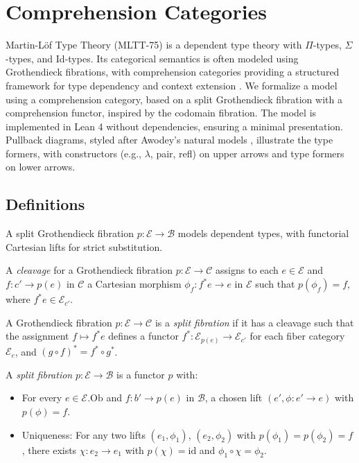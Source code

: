 \documentclass{article}
\begin{document}
\ifincludeTOC
  \tableofcontents
\fi

\section{Comprehension Categories}
Martin-Löf Type Theory (MLTT-75) is a dependent type theory with $\Pi$-types, $\Sigma$-types, and Id-types. Its categorical semantics is often modeled using Grothendieck fibrations, with comprehension categories providing a structured framework for type dependency and context extension \cite{ncatlab, jacobs1993}. We formalize a model using a comprehension category, based on a split Grothendieck fibration with a comprehension functor, inspired by the codomain fibration. The model is implemented in Lean 4 without dependencies, ensuring a minimal presentation. Pullback diagrams, styled after Awodey’s natural models \cite{awodey}, illustrate the type formers, with constructors (e.g., $\lambda$, pair, refl) on upper arrows and type formers on lower arrows.

\newpage
\subsection{Definitions}
A split Grothendieck fibration $p : \mathcal{E} \to \mathcal{B}$ models dependent types, with functorial Cartesian lifts for strict substitution.


\begin{definition}[Cleavage]
A \emph{cleavage} for a Grothendieck fibration \(p : \mathcal{E} \to \mathcal{C}\) assigns
to each \(e \in \mathcal{E}\) and \(f : c' \to p(e)\) in \(\mathcal{C}\) a Cartesian
morphism \(\phi_f : f^*e \to e\) in \(\mathcal{E}\) such that \(p(\phi_f) = f\), where \(f^*e \in \mathcal{E}_{c'}\).
\end{definition}

\begin{definition}
A Grothendieck fibration \(p : \mathcal{E} \to \mathcal{C}\) is
a \emph{split fibration} if it has a cleavage such that the
assignment \(f \mapsto f^*e\) defines a functor \(f^* : \mathcal{E}_{p(e)} \to \mathcal{E}_{c'}\)
for each fiber category \(\mathcal{E}_c\), and \((g \circ f)^* = f^* \circ g^*\).
\end{definition}

\begin{definition}
A \emph{split fibration} $p : \mathcal{E} \to \mathcal{B}$ is a functor $p$ with:
\begin{itemize}
  \item For every $e \in \mathcal{E}.\text{Ob}$ and $f : b' \to p(e)$ in $\mathcal{B}$, a chosen lift $(e', \phi : e' \to e)$ with $p(\phi) = f$.
  \item Uniqueness: For any two lifts $(e_1, \phi_1)$, $(e_2, \phi_2)$ with $p(\phi_1) = p(\phi_2) = f$, there exists $\chi : e_2 \to e_1$ with $p(\chi) = \text{id}$ and $\phi_1 \circ \chi = \phi_2$.
\end{itemize}
\end{definition}
\end{document}
